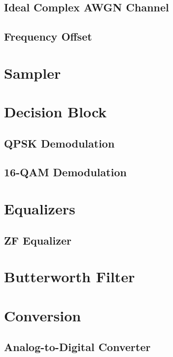 \documentclass[]{article}
\begin{document}
\subsection{Ideal Complex AWGN Channel}
\label{app:awgn_channel}


\subsection{Frequency Offset}
\label{app:freq}


\section{Sampler}
\label{app:sampler}


\section{Decision Block}
\label{app:dblocks}
\subsection{QPSK Demodulation}
\label{app:qpsk_demod}


\subsection{16-QAM Demodulation}
\label{app:16qam_demod}


\section{Equalizers}
\subsection{ZF Equalizer}



\section{Butterworth Filter}
\label{app:butterworth}


\section{Conversion}
\label{app:convert}
\subsection{Analog-to-Digital Converter}
\label{app:ad}

\end{document}
